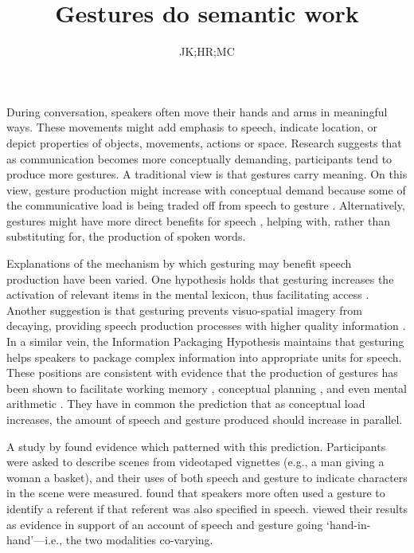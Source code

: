 \documentclass[a4paper,man,natbib]{apa6}
\title{Gestures do semantic work}
\author{JK;HR;MC}
\affiliation{Psychology, PPLS, University of Edinburgh}
\begin{document}
\maketitle
\linenumbers
\noindent
During conversation, speakers often move their hands and arms in meaningful ways.
These movements might add emphasis to speech, indicate location, or depict properties of objects, movements, actions or space.
Research suggests that as communication becomes more conceptually demanding, participants tend to produce more gestures.
A traditional view is that gestures carry meaning.
On this view, gesture production might increase with conceptual demand because some of the communicative load is being traded off from speech to gesture \citep{Melinger2004, Bangerter2004, DeRuiter2006}.
Alternatively, gestures might have more direct benefits for speech \citep{Rauscher1996, Krauss2000,Kita2000}, helping with, rather than substituting for, the production of spoken words.

Explanations of the mechanism by which gesturing may benefit speech production have been varied. 
One hypothesis holds that gesturing increases the activation of relevant items in the mental lexicon, thus facilitating access \citep{Krauss2000}.
Another suggestion is that gesturing prevents visuo-spatial imagery from decaying, providing speech production processes with higher quality information \citep{Hadar1997}. 
In a similar vein, the Information Packaging Hypothesis \citep{Kita2000, Kita2003} maintains that gesturing helps speakers to package complex information into appropriate units for speech. 
These positions are consistent with evidence that the production of gestures has been shown to facilitate working memory \citep{Wesp2001, Morsella2004}, conceptual planning \citep{Melinger2007}, and even mental arithmetic \citep{Goldin-Meadow2001}.
They have in common the prediction that as conceptual load increases, the amount of speech and gesture produced should increase in parallel.

A \citeyear{So2009} study by \citeauthor{So2009} found evidence which patterned with this prediction. 
Participants were asked to describe scenes from videotaped vignettes (e.g., a man giving a woman a basket), and their uses of both speech and gesture to indicate characters in the scene were measured.
\citeauthor{So2009} found that speakers more often used a gesture to identify a referent if that referent was also specified in speech. 
\citeauthor{So2009} viewed their results as evidence in support of an account of speech and gesture going `hand-in-hand'---i.e., the two modalities co-varying.
\end{document}
